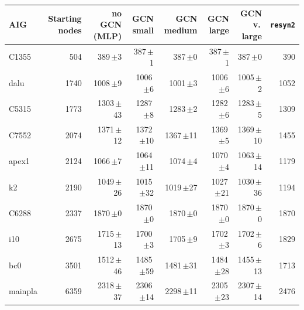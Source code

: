 {\footnotesize
\begin{tabular}{lrrrrrrr}
\toprule
AIG & Starting nodes & no GCN (MLP) & GCN small & GCN medium & GCN large & GCN v.\,large & \texttt{resyn2} \\
\midrule
C1355 & 504 & 389\,{\tiny$\pm$3} & 387\,{\tiny$\pm$1} & 387\,{\tiny$\pm$0} & 387\,{\tiny$\pm$1} & 387\,{\tiny$\pm$0} & 390 \\
dalu & 1740 & 1008\,{\tiny$\pm$9} & 1006\,{\tiny$\pm$6} & 1001\,{\tiny$\pm$3} & 1006\,{\tiny$\pm$6} & 1005\,{\tiny$\pm$2} & 1052 \\
C5315 & 1773 & 1303\,{\tiny$\pm$43} & 1287\,{\tiny$\pm$8} & 1283\,{\tiny$\pm$2} & 1282\,{\tiny$\pm$6} & 1283\,{\tiny$\pm$5} & 1309 \\
C7552 & 2074 & 1371\,{\tiny$\pm$12} & 1372\,{\tiny$\pm$10} & 1367\,{\tiny$\pm$11} & 1369\,{\tiny$\pm$5} & 1369\,{\tiny$\pm$10} & 1455 \\
apex1 & 2124 & 1066\,{\tiny$\pm$7} & 1064\,{\tiny$\pm$11} & 1074\,{\tiny$\pm$4} & 1070\,{\tiny$\pm$4} & 1063\,{\tiny$\pm$14} & 1179 \\
k2 & 2190 & 1049\,{\tiny$\pm$26} & 1015\,{\tiny$\pm$32} & 1019\,{\tiny$\pm$27} & 1027\,{\tiny$\pm$21} & 1030\,{\tiny$\pm$36} & 1194 \\
C6288 & 2337 & 1870\,{\tiny$\pm$0} & 1870\,{\tiny$\pm$0} & 1870\,{\tiny$\pm$0} & 1870\,{\tiny$\pm$0} & 1870\,{\tiny$\pm$0} & 1870 \\
i10 & 2675 & 1715\,{\tiny$\pm$13} & 1700\,{\tiny$\pm$3} & 1705\,{\tiny$\pm$9} & 1702\,{\tiny$\pm$3} & 1702\,{\tiny$\pm$6} & 1829 \\
bc0 & 3501 & 1512\,{\tiny$\pm$46} & 1485\,{\tiny$\pm$59} & 1481\,{\tiny$\pm$31} & 1484\,{\tiny$\pm$28} & 1455\,{\tiny$\pm$13} & 1713 \\
mainpla & 6359 & 2318\,{\tiny$\pm$37} & 2306\,{\tiny$\pm$14} & 2298\,{\tiny$\pm$11} & 2305\,{\tiny$\pm$23} & 2307\,{\tiny$\pm$14} & 2476 \\
\bottomrule
\end{tabular}}
